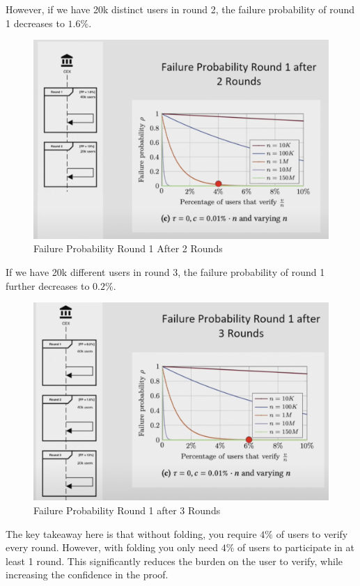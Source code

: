 However, if we have 20k distinct users in round 2, the failure probability of round 1 decreases to $1.6\%$.

\begin{figure}[H]
   \centering
   \includegraphics[width=130mm]{FailureProbabilityRound2.png}
   \caption{Failure Probability Round 1 After 2 Rounds \cite{NS23}}
   \label{overflow}
   \end{figure}

If we have 20k different users in round 3, the failure probability of round 1 further decreases to $0.2\%$.

\begin{figure}[H]
   \centering
   \includegraphics[width=130mm]{FailureProbabilityRound3.png}
   \caption{Failure Probability Round 1 after 3 Rounds \cite{NS23}}
   \label{overflow}
   \end{figure}
The key takeaway here is that without folding, you require $4\%$ of users to verify every round. However, with folding you only need
$4\%$ of users to participate in at least 1 round. This significantly reduces the burden on the user to verify, while increasing the confidence in the proof.

